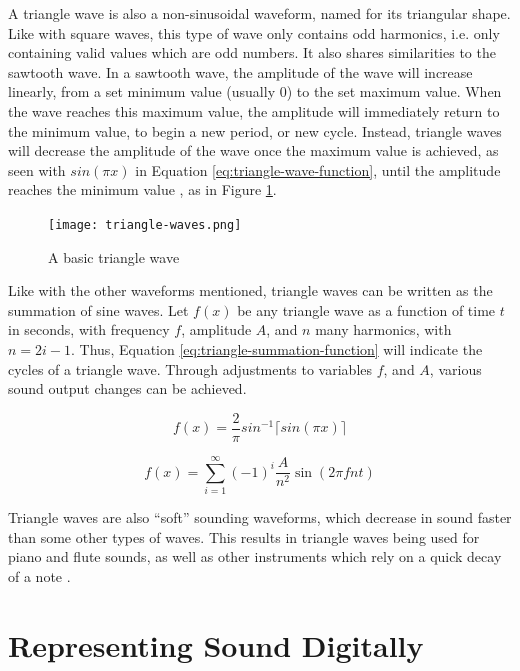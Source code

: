 A triangle wave is also a non-sinusoidal waveform, named for its triangular shape. Like with square waves, this type of wave only contains odd harmonics, i.e. only containing valid values which are odd numbers. It also shares similarities to the sawtooth wave. In a sawtooth wave, the amplitude of the wave will increase linearly, from a set minimum value (usually 0) to the set maximum value. When the wave reaches this maximum value, the amplitude will immediately return to the minimum value, to begin a new period, or new cycle. Instead, triangle waves will decrease the amplitude of the wave once the maximum value is achieved, as seen with $sin(\pi x)$ in Equation \ref{eq:triangle-wave-function}, until the amplitude reaches the minimum value \cite{Tarr_2019}, as in Figure \ref{fig:triangle-wave}.

\begin{figure}[ht]
  \centering
  \texttt{[image: triangle-waves.png]}
  \caption{A basic triangle wave}\cite{Wellesley_College_Staff_2021}
  \label{fig:triangle-wave}
\end{figure}


Like with the other waveforms mentioned, triangle waves can be written as the summation of sine waves. Let $f(x)$ be any triangle wave as a function of time $t$ in seconds, with frequency $f$, amplitude $A$, and $n$ many harmonics, with $n = 2i - 1$. Thus, Equation \ref{eq:triangle-summation-function} will indicate the cycles of a triangle wave. Through adjustments to variables $f$, and $A$, various sound output changes can be achieved. 

\begin{equation}
	f(x) = \frac{2}{\pi}sin^{-1}\lceil sin(\pi x) \rceil
	\label{eq:triangle-wave-function}	
\end{equation}

\begin{equation}
	f(x) = \sum_{i=1}^{\infty} (-1)^i \frac{A}{n^2} \sin(2\pi fnt)
	\label{eq:triangle-summation-function}
\end{equation}

Triangle waves are also ``soft'' sounding waveforms, which decrease in sound faster than some other types of waves. This results in triangle waves being used for piano and flute sounds, as well as other instruments which rely on a quick decay of a note \cite{Dowsett_2016}.

\section{Representing Sound Digitally}

